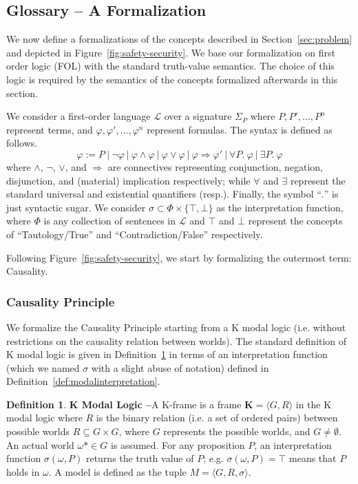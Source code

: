 \documentclass{article}
\theoremstyle{definition}
\newtheorem{definition}{Definition}[section]
\theoremstyle{corollary}
\theoremstyle{lemma}
\theoremstyle{theorem}
\theoremstyle{theorem}
\newcommand{\kframe}{\mathbf{K}}
\newcommand{\possibleworlds}{G}
\newcommand{\modalrelation}{R}
\newcommand{\actualworld}{\omega*}
\newcommand{\world}{\omega}
\newcommand{\kmodel}{M}
\newcommand{\interpretation}{\sigma}
\newcommand{\follang}{\mathcal{L}}
\begin{document}
\subsection{Glossary -- A Formalization}\label{sec:glossary}
We now define a formalizations of the concepts described in
Section~\ref{sec:problem} and depicted in Figure~\ref{fig:safety-security}. We
base our formalization on first order logic (FOL) with the standard
truth-value semantics. The choice of this logic is required by the 
semantics of the concepts formalized afterwards in this section. 

We consider a first-order language $\follang$ over a
signature $\Sigma_P$ where $P,P',\ldots,P^n$ represent terms, and
$\varphi,\varphi',\ldots,\varphi^n$ represent formulas.
The syntax is defined as follows.
\begin{displaymath}
	\varphi := P~|~\neg\varphi~|~\varphi\wedge\varphi~|~\varphi\vee\varphi~|~\varphi\Rightarrow\varphi'~|~\forall P.~\varphi~|~\exists P.~\varphi
\end{displaymath}
where $\wedge$, $\neg$, $\vee$, and $\Rightarrow$ are connectives representing
conjunction, negation, disjunction, and (material) implication respectively; while
$\forall$ and $\exists$ represent the standard universal and existential
quantifiers (resp.). Finally, the symbol ``$.$'' is just syntactic sugar. 
We consider $\interpretation\subset\Phi\times\{\top,\bot\}$ as the interpretation
function, where $\Phi$ is any collection of sentences in $\follang$ 
and $\top$ and $\bot$ represent the concepts of ``Tautology/True''
and ``Contradiction/False'' respectively.

Following Figure~\ref{fig:safety-security}, we start by formalizing the outermost term: Causality.

\subsubsection{Causality Principle}\label{sec:causality}
We formalize the Causality Principle starting from a K modal
logic\autocite{Garson2018modal} (i.e. without restrictions on the causality
relation between worlds). The standard definition of K modal logic is given in
Definition~\ref{def:modallogic} in terms of an interpretation function (which
we named $\sigma$ with a slight abuse of notation) defined in
Definition~\ref{def:modalinterpretation}. 
\begin{definition}{\bf K Modal Logic --}\label{def:modallogic}
A K-frame is a frame $ \kframe=\langle \possibleworlds,\modalrelation \rangle $
	in the K modal logic where $ \modalrelation $ is the binary relation
	(i.e. a set of ordered pairs) between possible worlds
	$\modalrelation\subseteq\possibleworlds\times\possibleworlds$, where
	$\possibleworlds$ represents the possible worlds, and
	$\possibleworlds\neq\emptyset$. An actual world
	$\actualworld\in\possibleworlds$ is assumed. For any proposition $P$,
	an interpretation function $\interpretation(\world,P)$ returns the
	truth value of $P$; e.g. $\interpretation(\world,P)=\top$ means that
	$P$ holds in $\world$. A model is defined as the tuple
	$\kmodel=\langle\possibleworlds,\modalrelation,\interpretation\rangle$.
\end{definition}
\end{document}
